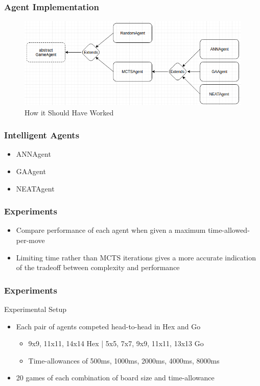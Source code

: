 \documentclass{beamer}
\begin{document}
\begin{frame}
\frametitle{Agent Implementation}
\vspace{-0.25in}
\begin{figure}
\centering
\includegraphics[scale=.35]{images/AgentShoulda.png}
\caption*{How it Should Have Worked}
\end{figure}

\end{frame}

\begin{frame}
\frametitle{Intelligent Agents}
\begin{itemize}
 \item ANNAgent
 \item GAAgent
 \item NEATAgent
\end{itemize}

\end{frame}

\begin{frame}
\frametitle{Experiments}
\begin{itemize}
 \item Compare performance of each agent when given a maximum time-allowed-per-move
 \item Limiting time rather than MCTS iterations gives a more accurate indication of the tradeoff between complexity and performance
\end{itemize}
\end{frame}

\begin{frame}
\frametitle{Experiments}
Experimental Setup
\begin{itemize}
 \item Each pair of agents competed head-to-head in Hex and Go
\begin{itemize}
 \item 9x9, 11x11, 14x14 Hex | 5x5, 7x7, 9x9, 11x11, 13x13 Go
 \item Time-allowances of 500ms, 1000ms, 2000ms, 4000ms, 8000ms
\end{itemize}
 \item 20 games of each combination of board size and time-allowance
\end{itemize}
\end{frame}
\end{document}
